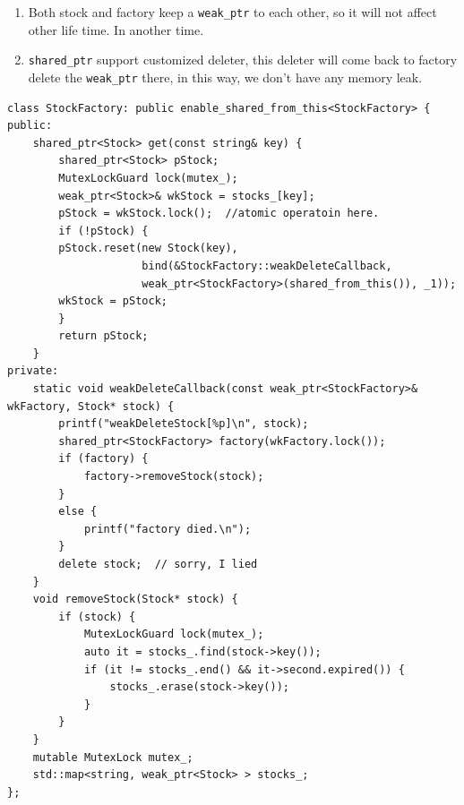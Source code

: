 \documentclass[a4paper,11pt,twoside]{book}
\begin{document}
\begin{itemize}
\begin{enumerate}
    \item Both stock and factory keep a \texttt{weak\_ptr} to each other, so it will not affect other life time. In another time. 

    \item \texttt{shared\_ptr} support customized deleter, this deleter will come back to factory delete the \texttt{weak\_ptr} there, in this way, we don't have any memory leak. 
\end{enumerate}

\begin{lstlisting}
class StockFactory: public enable_shared_from_this<StockFactory> {
public:
	shared_ptr<Stock> get(const string& key) {
		shared_ptr<Stock> pStock;
		MutexLockGuard lock(mutex_);
		weak_ptr<Stock>& wkStock = stocks_[key];
		pStock = wkStock.lock();  //atomic operatoin here.
		if (!pStock) {
		pStock.reset(new Stock(key),
                     bind(&StockFactory::weakDeleteCallback,
                     weak_ptr<StockFactory>(shared_from_this()), _1));
		wkStock = pStock;
		}
		return pStock;
	}
private:
	static void weakDeleteCallback(const weak_ptr<StockFactory>& wkFactory, Stock* stock) {
	    printf("weakDeleteStock[%p]\n", stock);
		shared_ptr<StockFactory> factory(wkFactory.lock());
		if (factory) {
			factory->removeStock(stock);
		}
		else {
			printf("factory died.\n");
		}
		delete stock;  // sorry, I lied
	}
	void removeStock(Stock* stock) {
		if (stock) {
			MutexLockGuard lock(mutex_);
			auto it = stocks_.find(stock->key());
			if (it != stocks_.end() && it->second.expired()) {
				stocks_.erase(stock->key());
			}
		}
	}
	mutable MutexLock mutex_;
	std::map<string, weak_ptr<Stock> > stocks_;
};
\end{lstlisting}


\end{itemize}
\end{document}
